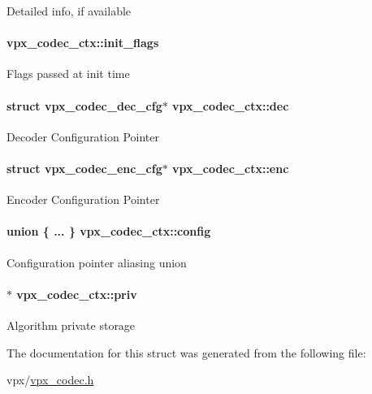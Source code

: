 Detailed info, if available \hypertarget{structvpx__codec__ctx_a76546548086c060a6bd21cb55037fb2b}{
\paragraph[{init\+\_\+flags}]{ vpx\+\_\+codec\+\_\+ctx\+::init\+\_\+flags}}\label{structvpx__codec__ctx_a76546548086c060a6bd21cb55037fb2b}
Flags passed at init time \hypertarget{structvpx__codec__ctx_abb82988485a036fb80e36ed22ec1e984}{
\paragraph[{dec}]{\setlength{\rightskip}{0pt plus 5cm}struct {\bf vpx\+\_\+codec\+\_\+dec\+\_\+cfg}$\ast$ vpx\+\_\+codec\+\_\+ctx\+::dec}}\label{structvpx__codec__ctx_abb82988485a036fb80e36ed22ec1e984}
Decoder Configuration Pointer \hypertarget{structvpx__codec__ctx_a3755f3c166d9aacd8a262a81ac18fa8f}{
\paragraph[{enc}]{\setlength{\rightskip}{0pt plus 5cm}struct {\bf vpx\+\_\+codec\+\_\+enc\+\_\+cfg}$\ast$ vpx\+\_\+codec\+\_\+ctx\+::enc}}\label{structvpx__codec__ctx_a3755f3c166d9aacd8a262a81ac18fa8f}
Encoder Configuration Pointer \hypertarget{structvpx__codec__ctx_aaa15a858376e55269a0a7ba5bff09f04}{
\paragraph[{config}]{\setlength{\rightskip}{0pt plus 5cm}union \{ ... \}                          vpx\+\_\+codec\+\_\+ctx\+::config}}\label{structvpx__codec__ctx_aaa15a858376e55269a0a7ba5bff09f04}
Configuration pointer aliasing union \hypertarget{structvpx__codec__ctx_acee775fd5b7580e112e245ce39733f92}{
\paragraph[{priv}]{$\ast$ vpx\+\_\+codec\+\_\+ctx\+::priv}}\label{structvpx__codec__ctx_acee775fd5b7580e112e245ce39733f92}
Algorithm private storage 

The documentation for this struct was generated from the following file\+:\begin{DoxyCompactItemize}
\item 
vpx/\hyperlink{vpx__codec_8h}{vpx\+\_\+codec.\+h}\end{DoxyCompactItemize}
